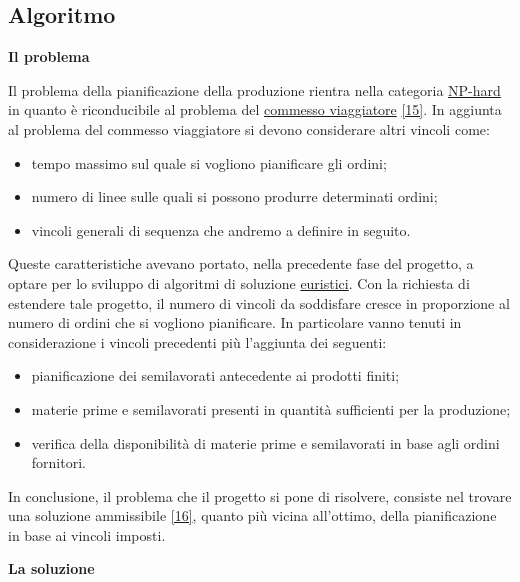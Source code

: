 \subsection{Algoritmo}

\textbf{Il problema}

Il problema della pianificazione della produzione rientra nella categoria \hyperref[Np-hard]{NP-hard\glo} in quanto è riconducibile al problema del 
\hyperref[Commesso viaggiatore]{commesso viaggiatore\glo} \hyperref[slide]{[15]}. 
In aggiunta al problema del commesso viaggiatore si devono considerare
altri vincoli come: 
\begin{itemize}
    \item tempo massimo sul quale si vogliono pianificare gli ordini;
    \item numero di linee sulle quali si possono produrre determinati ordini;
    \item vincoli generali di sequenza che andremo a definire in seguito.
\end{itemize}

Queste caratteristiche avevano portato, nella precedente fase del progetto, a optare per lo sviluppo di algoritmi di soluzione \hyperref[slide]{euristici\glo [15]}.
Con la richiesta di estendere tale progetto, il numero di vincoli da soddisfare cresce in proporzione al numero di ordini che si vogliono pianificare.
In particolare vanno tenuti in considerazione i vincoli precedenti più l'aggiunta dei seguenti:

\begin{itemize}
    \item pianificazione dei semilavorati antecedente ai prodotti finiti;
    \item materie prime e semilavorati presenti in quantità sufficienti per la produzione;
    \item verifica della disponibilità di materie prime e semilavorati in base agli ordini fornitori.
\end{itemize}

In conclusione, il problema che il progetto si pone di risolvere, consiste nel trovare una soluzione ammissibile \hyperref[slide0]{[16]}, quanto più vicina all'ottimo,
della pianificazione
in base ai vincoli imposti.\newline

\textbf{La soluzione}

